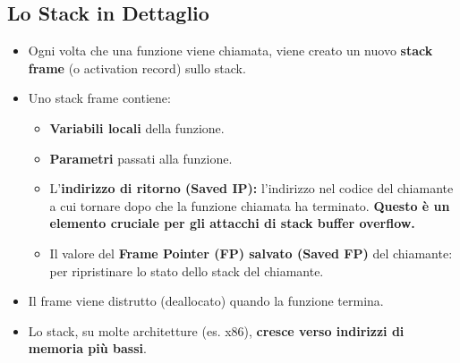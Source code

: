 \subsection{Lo Stack in Dettaglio}
\begin{itemize}
    \item Ogni volta che una funzione viene chiamata, viene creato un nuovo \textbf{stack frame} (o activation record) sullo stack.
    \item Uno stack frame contiene:
        \begin{itemize}
            \item \textbf{Variabili locali} della funzione.
            \item \textbf{Parametri} passati alla funzione.
            \item L'\textbf{indirizzo di ritorno (Saved IP):} l'indirizzo nel codice del chiamante a cui tornare dopo che la funzione chiamata ha terminato. \textbf{Questo è un elemento cruciale per gli attacchi di stack buffer overflow.}
            \item Il valore del \textbf{Frame Pointer (FP) salvato (Saved FP)} del chiamante: per ripristinare lo stato dello stack del chiamante.
        \end{itemize}
    \item Il frame viene distrutto (deallocato) quando la funzione termina.
    \item Lo stack, su molte architetture (es. x86), \textbf{cresce verso indirizzi di memoria più bassi}.
\end{itemize}

